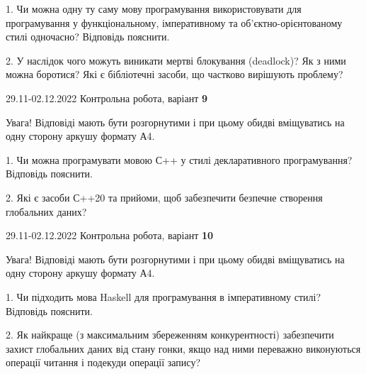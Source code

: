 \documentclass[11pt, ukrainian]{article}
\begin{document}
{
\begin {large}

1. Чи можна одну ту саму мову програмування використовувати для програмування у функціональному, імперативному та об’єктно-орієнтованому стилі одночасно? Відповідь пояснити.%

2. У наслідок чого можуть виникати мертві блокування (deadlock)? Як з ними можна боротися? Які є бібліотечні засоби, що частково вирішують проблему?

\end {large}}

\vspace{4mm}
\newpage
{29.11-02.12.2022 Контрольна робота, варіант  \No \textbf { 9 }\par}
Увага! Відповіді мають бути розгорнутими і при цьому обидві вміщуватись на одну сторону аркушу формату А4.

{
\begin {large}

1. Чи можна програмувати мовою С++ у стилі декларативного програмування? Відповідь пояснити.%

2. Які є засоби С++20 та прийоми, щоб забезпечити безпечне створення глобальних даних?

\end {large}}

\vspace{4mm}



{29.11-02.12.2022 Контрольна робота, варіант  \No \textbf { 10 }\par}
Увага! Відповіді мають бути розгорнутими і при цьому обидві вміщуватись на одну сторону аркушу формату А4.

{
\begin {large}

1. Чи підходить мова Haskell для програмування в імперативному стилі? Відповідь пояснити.%

2. Як найкраще (з максимальним збереженням конкурентності) забезпечити захист глобальних даних від стану гонки, якщо над ними переважно виконуються операції читання і подекуди операції запису?

\end {large}}

\vspace{4mm}
\end{document}
